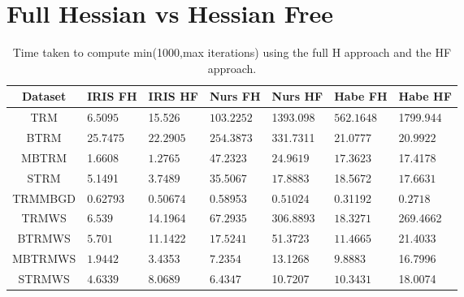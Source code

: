 \documentclass[letterpaper,12pt,titlepage,oneside,final]{book}
\begin{document}
\chapter{Full Hessian vs Hessian Free}
\label{appendix:fhhf}
\begin{table}[h] 
	\centering 
	\begin{tabular}{ |c|l|l|l|l|l|l| } 
		\hline 
		\textbf{Dataset} & \textbf{IRIS} FH & \textbf{IRIS} HF & \textbf{Nurs} FH & \textbf{Nurs} HF & \textbf{Habe} FH & \textbf{Habe} HF \\ 
		\hline 
		TRM & $\mathbf{6.5095}$ &15.526 & $\mathbf{103.2252}$ &1393.098 & $\mathbf{562.1648}$ &1799.944\\
		\hline 
		BTRM &25.7475 & $\mathbf{22.2905}$ & $\mathbf{254.3873}$ &331.7311 &21.0777 & $\mathbf{20.9922}$\\ 
		\hline 
		MBTRM &1.6608 & $\mathbf{1.2765}$ &47.2323 & $\mathbf{24.9619}$ & $\mathbf{17.3623}$ &17.4178\\ 
		\hline 
		STRM &5.1491 & $\mathbf{3.7489}$ &35.5067 & $\mathbf{17.8883}$ &18.5672 & $\mathbf{17.6631}$\\ 
		\hline 
		TRMMBGD &0.62793 & $\mathbf{0.50674}$ &0.58953 & $\mathbf{0.51024}$ &0.31192 & $\mathbf{0.2718}$\\ 
		\hline 
		TRMWS & $\mathbf{6.539}$ &14.1964 & $\mathbf{67.2935}$ &306.8893 & $\mathbf{18.3271}$ &269.4662\\ 
		\hline 
		BTRMWS & $\mathbf{5.701}$ &11.1422 & $\mathbf{17.5241}$ &51.3723 & $\mathbf{11.4665}$ &21.4033\\ 
		\hline 
		MBTRMWS & $\mathbf{1.9442}$ &3.4353 & $\mathbf{7.2354}$ &13.1268 & $\mathbf{9.8883}$ &16.7996\\ 
		\hline 
		STRMWS & $\mathbf{4.6339}$ &8.0689 & $\mathbf{6.4347}$ &10.7207 & $\mathbf{10.3431}$ &18.0074\\ 
		\hline 
	\end{tabular} 
	\caption{Time taken to compute min(1000,max iterations) using the full H approach and the HF approach.} 
\end{table}
\end{document}
